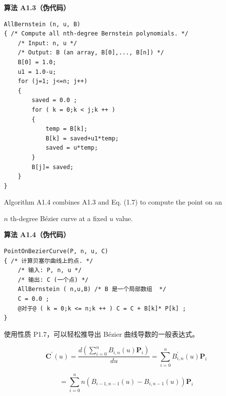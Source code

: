 \documentclass[../main.tex]{subfiles}
\begin{document}
\par\medskip\noindent\textbf{算法 A1.3（伪代码）}\par
\begin{verbatim}
AllBernstein (n, u, B)
{ /* Compute all nth-degree Bernstein polynomials. */
    /* Input: n, u */
    /* Output: B (an array, B[0],..., B[n]) */
    B[0] = 1.0;
    u1 = 1.0-u;
    for (j=1; j<=n; j++)
    {
        saved = 0.0 ;
        for ( k = 0;k < j;k ++ )
        {
            temp = B[k];
            B[k] = saved+u1*temp;
            saved = u*temp;
        }
        B[j]= saved;
    }
}
\end{verbatim}

\begin{center}
\begin{minipage}{12cm}
\centering
\captionsetup{font=small,skip=6pt,justification=centering}
\smallskip
{}
\end{minipage}
\end{center}
\par\medskip

Algorithm A1.4 combines A1.3 and Eq. (1.7) to compute the point on an

\(n\) th-degree Bézier curve at a fixed \(u\) value.

\par\medskip\noindent\textbf{算法 A1.4（伪代码）}\par
\begin{verbatim}
PointOnBezierCurve(P, n, u, C)
{ /* 计算贝塞尔曲线上的点. */
    /* 输入: P, n, u */
    /* 输出: C (一个点) */
    AllBernstein ( n,u,B) /* B 是一个局部数组  */
    C = 0.0 ;
    @对于@ ( k = 0;k <= n;k ++ ) C = C + B[k]* P[k] ;
}
\end{verbatim}

使用性质 P1.7，可以轻松推导出 Bézier 曲线导数的一般表达式。

\[
{\mathbf{C}}^{\prime }\left( u\right)  = \frac{d\left( {\mathop{\sum }\limits_{{i = 0}}^{n}{B}_{i,n}\left( u\right) {\mathbf{P}}_{i}}\right) }{du} = \mathop{\sum }\limits_{{i = 0}}^{n}{B}_{i,n}^{\prime }\left( u\right) {\mathbf{P}}_{i}
\]

\[
= \mathop{\sum }\limits_{{i = 0}}^{n}n\left( {{B}_{i - 1,n - 1}\left( u\right)  - {B}_{i,n - 1}\left( u\right) }\right) {\mathbf{P}}_{i}
\]
\end{document}
